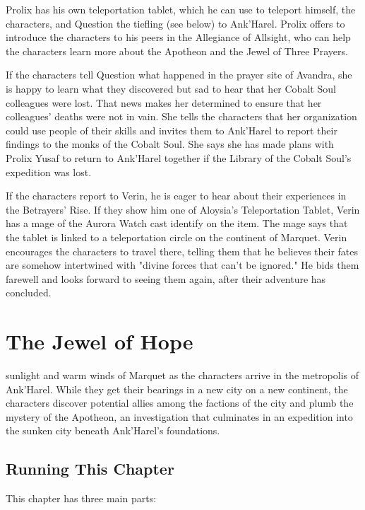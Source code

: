 \documentclass[10pt,a4paper,twoside,bg=print,twocolumn,openany,nodeprecatedcode]{dndbook}
\begin{document}
\begin{description}[nolistsep]
\item[Prolix Yusaf.]
Prolix has his own teleportation tablet, which he can use to teleport himself, the characters, and Question the tiefling (see below) to Ank'Harel. Prolix offers to introduce the characters to his peers in the Allegiance of Allsight, who can help the characters learn more about the Apotheon and the Jewel of Three Prayers.
\item[Question.]
If the characters tell Question what happened in the prayer site of Avandra, she is happy to learn what they discovered but sad to hear that her Cobalt Soul colleagues were lost. That news makes her determined to ensure that her colleagues' deaths were not in vain. She tells the characters that her organization could use people of their skills and invites them to Ank'Harel to report their findings to the monks of the Cobalt Soul. She says she has made plans with Prolix Yusaf to return to Ank'Harel together if the Library of the Cobalt Soul's expedition was lost.
\item[Taskhand Verin Thelyss.]
If the characters report to Verin, he is eager to hear about their experiences in the Betrayers' Rise. If they show him one of Aloysia's Teleportation Tablet, Verin has a mage of the Aurora Watch cast identify on the item. The mage says that the tablet is linked to a teleportation circle on the continent of Marquet. Verin encourages the characters to travel there, telling them that he believes their fates are somehow intertwined with "divine forces that can't be ignored." He bids them farewell and looks forward to seeing them again, after their adventure has concluded.
\end{description}

\chapter{The Jewel of Hope}

 sunlight and warm winds of Marquet as the characters arrive in the metropolis of Ank'Harel. While they get their bearings in a new city on a new continent, the characters discover potential allies among the factions of the city and plumb the mystery of the Apotheon, an investigation that culminates in an expedition into the sunken city beneath Ank'Harel's foundations.

\section{Running This Chapter}
This chapter has three main parts:
\end{document}
